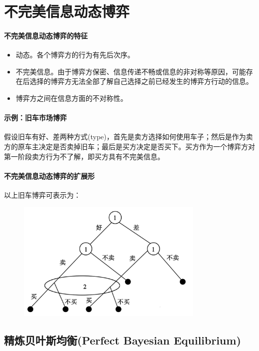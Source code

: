 \documentclass[12pt,a4paper]{article}
\begin{document}
\newpage
\section{不完美信息动态博弈}
\paragraph{不完美信息动态博弈的特征}
\begin{itemize}
	\item 动态。各个博弈方的行为有先后次序。
	\item 不完美信息。由于博弈方保密、信息传递不畅或信息的非对称等原因，可能存在后选择的博弈方无法全部了解自己选择之前已经发生的博弈方行动的信息。
	\item 博弈方之间在信息方面的不对称性。
\end{itemize}
\paragraph{示例：旧车市场博弈} 假设旧车有好、差两种方式(type)，首先是卖方选择如何使用车子；然后是作为卖方的原车主决定是否卖掉旧车；最后是买方决定是否买下。买方作为一个博弈方对第一阶段卖方行为不了解，即买方具有不完美信息。
\paragraph{不完美信息动态博弈的扩展形} 以上旧车博弈可表示为：
\begin{figure}[H]
	\centering
	\includegraphics[width=0.8\textwidth]{../images/game-theory-jiuche.png}
	\caption{}
	\label{}
\end{figure}
\subsection{精炼贝叶斯均衡(Perfect Bayesian Equilibrium)}
\end{document}
